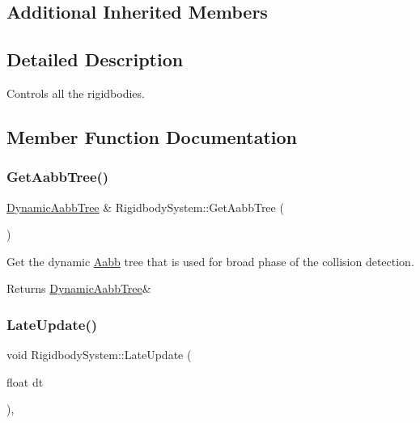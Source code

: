 \subsection*{Additional Inherited Members}


\subsection{Detailed Description}
Controls all the rigidbodies. 

\subsection{Member Function Documentation}
\mbox{\label{classRigidbodySystem_aadf0ff84d1e6469ca8d6281aa0f9af70}} 
\subsubsection{\texorpdfstring{Get\+Aabb\+Tree()}{GetAabbTree()}}
{\footnotesize\ttfamily \hyperlink{classDynamicAabbTree}{Dynamic\+Aabb\+Tree} \& Rigidbody\+System\+::\+Get\+Aabb\+Tree (\begin{DoxyParamCaption}{ }\end{DoxyParamCaption})}



Get the dynamic \hyperlink{classAabb}{Aabb} tree that is used for broad phase of the collision detection. 

\begin{DoxyReturn}{Returns}
\hyperlink{classDynamicAabbTree}{Dynamic\+Aabb\+Tree}\& 
\end{DoxyReturn}
\mbox{\label{classRigidbodySystem_a3ae11c7e5a8572247fb2e01729e32af9}} 
\subsubsection{\texorpdfstring{Late\+Update()}{LateUpdate()}}
{\footnotesize\ttfamily void Rigidbody\+System\+::\+Late\+Update (\begin{DoxyParamCaption}\item[{float}]{dt }\end{DoxyParamCaption})\hspace{0.3cm}{\ttfamily [override]}, {\ttfamily [virtual]}}



